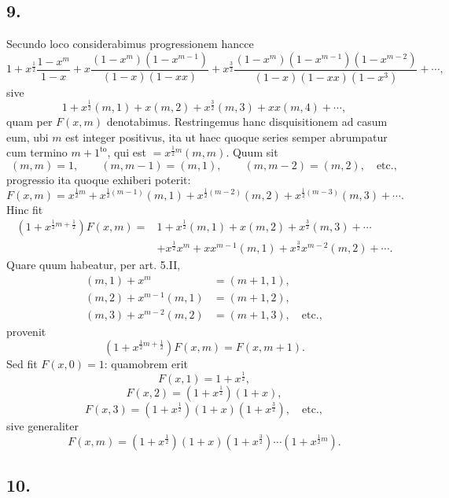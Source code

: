 \documentclass[12pt]{article}
\begin{document}
\subsection*{9.}

Secundo loco considerabimus progressionem hancce
\[
1+x^{\frac12}\frac{1-x^m}{1-x}
+x\frac{(1-x^m)(1-x^{m-1})}{(1-x)(1-xx)}
+x^{\frac32}\frac{(1-x^m)(1-x^{m-1})(1-x^{m-2})}{(1-x)(1-xx)(1-x^3)}
+\cdots,
\]
sive
\[
1+x^{\frac12}(m,1)+x(m,2)+x^{\frac32}(m,3)+xx(m,4)+\cdots,
\]
quam per $F(x,m)$ denotabimus. Restringemus hanc disquisitionem ad casum eum, ubi $m$ est integer positivus, ita ut haec quoque series semper abrumpatur cum termino $m+1^{\mathrm{to}}$, qui est $=x^{\frac12m}(m,m)$. Quum sit
\[
(m,m)=1,\qquad (m,m-1)=(m,1),\qquad (m,m-2)=(m,2),\quad\text{etc.},
\]
progressio ita quoque exhiberi poterit:
\[
F(x,m)=x^{\frac12m}+x^{\frac12(m-1)}(m,1)+x^{\frac12(m-2)}(m,2)+x^{\frac12(m-3)}(m,3)+\cdots.
\]
Hinc fit
\[
\begin{aligned}
(1+x^{\frac12m+\frac12})F(x,m)
={}&1+x^{\frac12}(m,1)+x(m,2)+x^{\frac32}(m,3)+\cdots\\
&+x^{\frac12}x^m+x x^{m-1}(m,1)+x^{\frac32}x^{m-2}(m,2)+\cdots.
\end{aligned}
\]
Quare quum habeatur, per art. 5.II,
\[
\begin{aligned}
(m,1)+x^m&=(m+1,1),\\
(m,2)+x^{m-1}(m,1)&=(m+1,2),\\
(m,3)+x^{m-2}(m,2)&=(m+1,3),\quad\text{etc.},
\end{aligned}
\]
provenit
\[
(1+x^{\frac12m+\frac12})F(x,m)=F(x,m+1). \tag{3}
\]
Sed fit $F(x,0)=1$: quamobrem erit
\[
F(x,1)=1+x^{\frac12},
\]
\[
F(x,2)=(1+x^{\frac12})(1+x),
\]
\[
F(x,3)=(1+x^{\frac12})(1+x)(1+x^{\frac32}),\quad\text{etc.},
\]
sive generaliter
\[
F(x,m)=(1+x^{\frac12})(1+x)(1+x^{\frac32})\cdots(1+x^{\frac12m}). \tag{4}
\]

\subsection*{10.}
\end{document}
